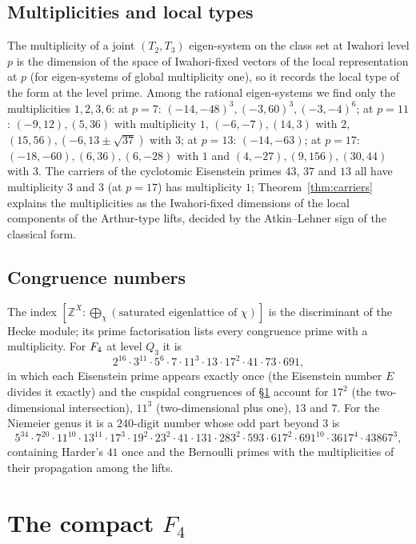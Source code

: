 \documentclass[11pt]{amsart}
\theoremstyle{definition}
\newcommand{\Z}{\mathbb{Z}}\newcommand{\Q}{\mathbb{Q}}\newcommand{\R}{\mathbb{R}}\newcommand{\A}{\mathbb{A}}\newcommand{\F}{\mathbb{F}}
\begin{document}
\subsection{Multiplicities and local types} The multiplicity of a joint $(T_2,T_3)$ eigen-system on the class set at Iwahori level $p$ is the dimension of the space of Iwahori-fixed vectors of the local representation at $p$ (for eigen-systems of global multiplicity one), so it records the local type of the form at the level prime. Among the rational eigen-systems we find only the multiplicities $1,2,3,6$: at $p=7$: $(-14,-48)^3,(-3,60)^3,(-3,-4)^6$; at $p=11$: $(-9,12),(5,36)$ with multiplicity $1$, $(-6,-7),(14,3)$ with $2$, $(15,56),(-6,13\pm\sqrt{37})$ with $3$; at $p=13$: $(-14,-63)$; at $p=17$: $(-18,-60),(6,36),(6,-28)$ with $1$ and $(4,-27),(9,156),(30,44)$ with $3$. The carriers of the cyclotomic Eisenstein primes $43$, $37$ and $13$ all have multiplicity $3$ and $3$ (at $p=17$) has multiplicity $1$; Theorem~\ref{thm:carriers} explains the multiplicities as the Iwahori-fixed dimensions of the local components of the Arthur-type lifts, decided by the Atkin--Lehner sign of the classical form.

\subsection{Congruence numbers} The index $[\Z^X:\bigoplus_\chi(\text{saturated eigenlattice of }\chi)]$ is the discriminant of the Hecke module; its prime factorisation lists every congruence prime with a multiplicity. For $F_4$ at level $Q_3$ it is
\[2^{16}\cdot3^{11}\cdot5^{6}\cdot7\cdot11^{3}\cdot13\cdot17^{2}\cdot41\cdot73\cdot691,\]
in which each Eisenstein prime appears exactly once (the Eisenstein number $E$ divides it exactly) and the cuspidal congruences of \S\ref{sec:f4} account for $17^2$ (the two-dimensional intersection), $11^3$ (two-dimensional plus one), $13$ and $7$. For the Niemeier genus it is a $240$-digit number whose odd part beyond $3$ is
\[5^{34}\cdot7^{20}\cdot11^{10}\cdot13^{11}\cdot17^{3}\cdot19^{2}\cdot23^{2}\cdot41\cdot131\cdot283^{2}\cdot593\cdot617^{2}\cdot691^{10}\cdot3617^{4}\cdot43867^{3},\]
containing Harder's $41$ once and the Bernoulli primes with the multiplicities of their propagation among the lifts.

\section{The compact $F_4$}\label{sec:f4}
\end{document}
